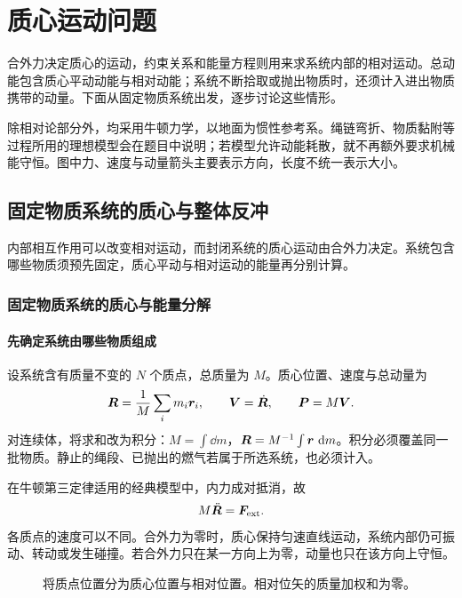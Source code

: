 \chapter{质心运动问题}


合外力决定质心的运动，约束关系和能量方程则用来求系统内部的相对运动。总动能包含质心平动动能与相对动能；系统不断拾取或抛出物质时，还须计入进出物质携带的动量。下面从固定物质系统出发，逐步讨论这些情形。

除相对论部分外，均采用牛顿力学，以地面为惯性参考系。绳链弯折、物质黏附等过程所用的理想模型会在题目中说明；若模型允许动能耗散，就不再额外要求机械能守恒。图中力、速度与动量箭头主要表示方向，长度不统一表示大小。



\section{固定物质系统的质心与整体反冲}

内部相互作用可以改变相对运动，而封闭系统的质心运动由合外力决定。系统包含哪些物质须预先固定，质心平动与相对运动的能量再分别计算。



\subsection{固定物质系统的质心与能量分解}
\subsubsection{先确定系统由哪些物质组成}
设系统含有质量不变的 $N$ 个质点，总质量为 $M$。质心位置、速度与总动量为
\begin{equation}
\bm{R}=\frac1M\sum_i m_i\bm{r}_i,\qquad
\bm{V}=\dot{\bm{R}},\qquad \bm{P}=M\bm{V}.
\label{sup3:eq:d3-cm}
\end{equation}
对连续体，将求和改为积分：$M=\int\dd m$，$\bm{R}=M^{-1}\int\bm{r}\,\mathop{}\!\mathrm d m$。积分必须覆盖同一批物质。静止的绳段、已抛出的燃气若属于所选系统，也必须计入。

在牛顿第三定律适用的经典模型中，内力成对抵消，故
\begin{equation}
M\ddot{\bm{R}}=\bm{F}_{\rm ext}.
\label{sup3:eq:d3-cm-eom}
\end{equation}
各质点的速度可以不同。合外力为零时，质心保持匀速直线运动，系统内部仍可振动、转动或发生碰撞。若合外力只在某一方向上为零，动量也只在该方向上守恒。

\begin{figure}[H]\centering
{}
\caption{将质点位置分为质心位置与相对位置。相对位矢的质量加权和为零。}\label{sup3:fig:d3-cm}
\end{figure}

